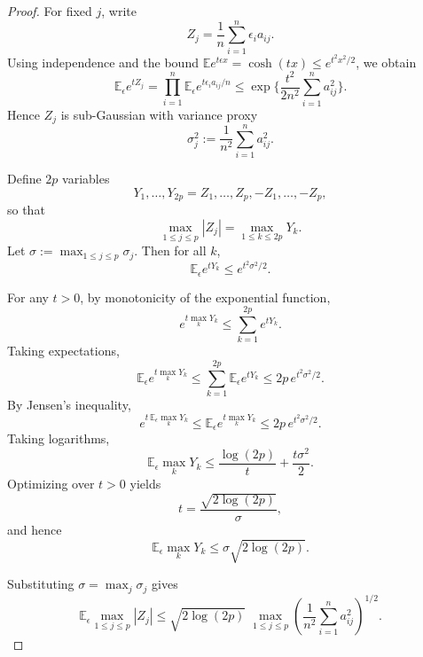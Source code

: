 \documentclass[12pt]{article}
\renewcommand{\(}{\left(}%
\renewcommand{\)}{\right)}%
\renewcommand{\[}{\left[}%
\renewcommand{\]}{\right]}%
\newtheorem{proof}{Proof.}}
\begin{document}
\begin{proof}
For fixed $j$, write
\begin{equation*}
Z_j = \frac{1}{n}\sum_{i=1}^n \epsilon_i a_{ij}.
\end{equation*}
Using independence and the bound $\mathbb{E}e^{t\epsilon x}=\cosh(tx)\le e^{t^2x^2/2}$, we obtain
\begin{equation*}
\mathbb{E}_\epsilon e^{t Z_j}
=
\prod_{i=1}^n \mathbb{E}_\epsilon e^{t\epsilon_i a_{ij}/n}
\le
\exp\bigg\{\frac{t^2}{2n^2}\sum_{i=1}^n a_{ij}^2\bigg\}.
\end{equation*}
Hence $Z_j$ is sub-Gaussian with variance proxy
\begin{equation*}
\sigma_j^2 := \frac{1}{n^2}\sum_{i=1}^n a_{ij}^2.
\end{equation*}

Define $2p$ variables
\begin{equation*}
Y_1,\dots,Y_{2p} = Z_1,\dots,Z_p,-Z_1,\dots,-Z_p,
\end{equation*}
so that
\begin{equation*}
\max_{1\le j\le p} |Z_j| = \max_{1\le k\le 2p} Y_k.
\end{equation*}
Let $\sigma := \max_{1\le j\le p} \sigma_j.$
Then for all $k$,
\begin{equation*}
\mathbb{E}_\epsilon e^{t Y_k} \le e^{t^2 \sigma^2/2}.
\end{equation*}

For any $t>0$, by monotonicity of the exponential function,
\begin{equation*}
e^{t \max_k Y_k} \le \sum_{k=1}^{2p} e^{t Y_k}.
\end{equation*}
Taking expectations,
\begin{equation*}
\mathbb{E}_\epsilon e^{t \max_k Y_k}
\le
\sum_{k=1}^{2p} \mathbb{E}_\epsilon e^{t Y_k}
\le
2p \, e^{t^2\sigma^2/2}.
\end{equation*}
By Jensen's inequality,
\begin{equation*}
e^{t\, \mathbb{E}_\epsilon \max_k Y_k}
\le
\mathbb{E}_\epsilon e^{t \max_k Y_k}
\le
2p \, e^{t^2\sigma^2/2}.
\end{equation*}
Taking logarithms,
\begin{equation*}
\mathbb{E}_\epsilon \max_k Y_k
\le
\frac{\log(2p)}{t} + \frac{t\sigma^2}{2}.
\end{equation*}
Optimizing over $t>0$ yields
\begin{equation*}
t = \frac{\sqrt{2\log(2p)}}{\sigma},
\end{equation*}
and hence
\begin{equation*}
\mathbb{E}_\epsilon \max_k Y_k
\le
\sigma \sqrt{2\log(2p)}.
\end{equation*}

Substituting $\sigma = \max_j \sigma_j$ gives
\begin{equation*}
\mathbb{E}_\epsilon \max_{1\le j\le p} |Z_j|
\le
\sqrt{2\log(2p)}\;
\max_{1\le j\le p}
\left(\frac{1}{n^2}\sum_{i=1}^n a_{ij}^2\right)^{1/2}.
\end{equation*}
\end{proof}
\end{document}
